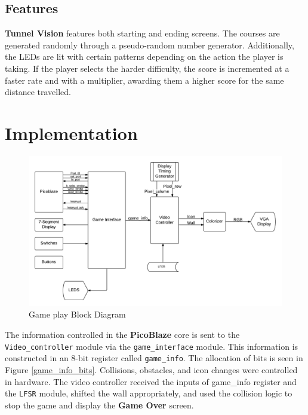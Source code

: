 \documentclass[11pt]{article}
\begin{document}
\subsection{Features}
\textbf{Tunnel Vision} features both starting and ending screens. The courses are generated randomly through a pseudo-random number generator. Additionally, the LEDs are lit with certain patterns depending on the action the player is taking. If the player selects the harder difficulty, the score is incremented at a faster rate and with a multiplier, awarding them a higher score for the same distance travelled.	

\section{Implementation}

	\begin{figure}[h]\centering
	\includegraphics[height=0.7\textwidth, width=0.7\textheight]{Images/gameplay_diagram.png}
	\caption{Game play Block Diagram}
		\label{block_diagram}
	\end{figure}	
		
The information controlled in the \textbf{PicoBlaze} core is sent to the \texttt{Video\_controller} module via the \texttt{game\_interface} module.  This information is constructed in an 8-bit register called \texttt{game\_info}.  The allocation of bits is seen in Figure \ref{game_info_bits}.  Collisions, obstacles, and icon changes were controlled in hardware.  The video controller received the inputs of game\_info register and the \texttt{LFSR} module, shifted the wall appropriately, and used the collision logic to stop the game and display the \textbf{Game Over} screen.
\end{document}
